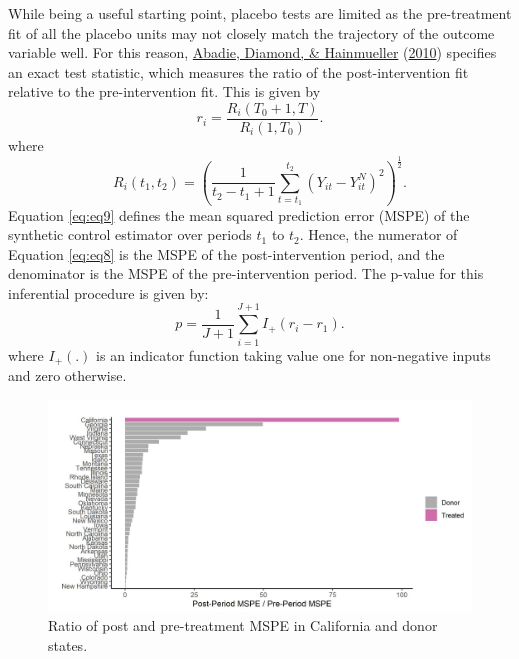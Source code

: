 \documentclass[12pt,nobind, a4paper]{reedthesis}
\begin{document}
 While being a useful starting point, placebo tests are limited as the pre-treatment fit of all the placebo units may not closely match the trajectory of the outcome variable well. For this reason, \protect\hyperlink{ref-abadie_synthetic_2010}{Abadie, Diamond, \& Hainmueller} (\protect\hyperlink{ref-abadie_synthetic_2010}{2010}) specifies an exact test statistic, which measures the ratio of the post-intervention fit relative to the pre-intervention fit. This is given by
 \begin{equation}
 r_{i}= \frac{R_{i}(T_{0}+1,T)}{R_{i}(1,T_{0})}.
 \label{eq:eq8}
 \end{equation}
 where
 \begin{equation}
 R_{i}(t_{1},t_{2})= \left
 (\frac{1}{t_{2}-t_{1}+1} \sum_{t=t_{1}}^{t_{2}}(Y_{it}-Y_{it}^{N})^2\right)^{\frac{1}{2}}.
 \label{eq:eq9}
 \end{equation}
 Equation \eqref{eq:eq9} defines the mean squared prediction error (MSPE) of the synthetic control estimator over periods \(t_{1}\) to \(t_{2}\). Hence, the numerator of Equation \eqref{eq:eq8} is the MSPE of the post-intervention period, and the denominator is the MSPE of the pre-intervention period. The p-value for this inferential procedure is given by:
 \begin{equation}
 p= \frac{1}{J+1} \sum_{i=1}^{J+1}I_{+}(r_{i}-r_{1}).
 \label{eq:eq10}
 \end{equation}
 where \(I_{+}(.)\) is an indicator function taking value one for non-negative inputs and zero otherwise.
 \begin{figure}

 {\centering \includegraphics[width=1\linewidth]{figure/calmspe} 

 }

 \caption{Ratio of post and pre-treatment MSPE in California and donor states.}\label{fig:mspe}
 \end{figure}
\end{document}
